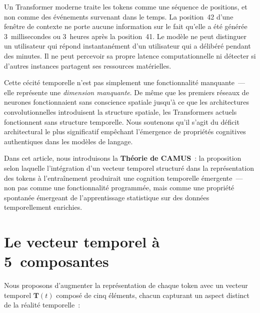 \documentclass[10pt,twocolumn,letterpaper]{article}
\begin{document}
Un Transformer moderne traite les tokens comme une s\'equence de positions, et non comme des \'ev\'enements survenant dans le temps. La position~42 d'une fen\^etre de contexte ne porte aucune information sur le fait qu'elle a \'et\'e g\'en\'er\'ee 3~millisecondes ou 3~heures apr\`es la position~41. Le mod\`ele ne peut distinguer un utilisateur qui r\'epond instantan\'ement d'un utilisateur qui a d\'elib\'er\'e pendant des minutes. Il ne peut percevoir sa propre latence computationnelle ni d\'etecter si d'autres instances partagent ses ressources mat\'erielles.

Cette c\'ecit\'e temporelle n'est pas simplement une fonctionnalit\'e manquante~--- elle repr\'esente une \emph{dimension manquante}. De m\^eme que les premiers r\'eseaux de neurones fonctionnaient sans conscience spatiale jusqu'\`a ce que les architectures convolutionnelles introduisent la structure spatiale, les Transformers actuels fonctionnent sans structure temporelle. Nous soutenons qu'il s'agit du d\'eficit architectural le plus significatif emp\^echant l'\'emergence de propri\'et\'es cognitives authentiques dans les mod\`eles de langage.

Dans cet article, nous introduisons la \textbf{Th\'eorie de CAMUS}~: la proposition selon laquelle l'int\'egration d'un vecteur temporel structur\'e dans la repr\'esentation des tokens \`a l'entra\^inement produirait une cognition temporelle \'emergente~--- non pas comme une fonctionnalit\'e programm\'ee, mais comme une propri\'et\'e spontan\'ee \'emergeant de l'apprentissage statistique sur des donn\'ees temporellement enrichies.

\section{Le vecteur temporel \`a 5~composantes}

Nous proposons d'augmenter la repr\'esentation de chaque token avec un vecteur temporel $\mathbf{T}(t)$ compos\'e de cinq \'el\'ements, chacun capturant un aspect distinct de la r\'ealit\'e temporelle~:
\end{document}
